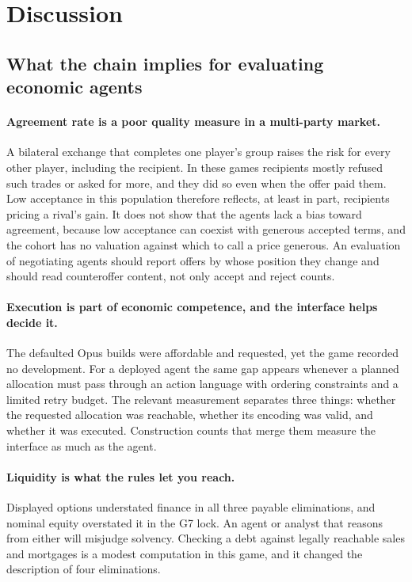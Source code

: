 \section{Discussion}
\label{sec:discussion}

\subsection{What the chain implies for evaluating economic agents}

\paragraph{Agreement rate is a poor quality measure in a multi-party market.} A bilateral exchange that completes one player's group raises the risk for every other player, including the recipient. In these games recipients mostly refused such trades or asked for more, and they did so even when the offer paid them. Low acceptance in this population therefore reflects, at least in part, recipients pricing a rival's gain. It does not show that the agents lack a bias toward agreement, because low acceptance can coexist with generous accepted terms, and the cohort has no valuation against which to call a price generous. An evaluation of negotiating agents should report offers by whose position they change and should read counteroffer content, not only accept and reject counts.

\paragraph{Execution is part of economic competence, and the interface helps decide it.} The defaulted Opus builds were affordable and requested, yet the game recorded no development. For a deployed agent the same gap appears whenever a planned allocation must pass through an action language with ordering constraints and a limited retry budget. The relevant measurement separates three things: whether the requested allocation was reachable, whether its encoding was valid, and whether it was executed. Construction counts that merge them measure the interface as much as the agent.

\paragraph{Liquidity is what the rules let you reach.} Displayed options understated finance in all three payable eliminations, and nominal equity overstated it in the G7 lock. An agent or analyst that reasons from either will misjudge solvency. Checking a debt against legally reachable sales and mortgages is a modest computation in this game, and it changed the description of four eliminations.

